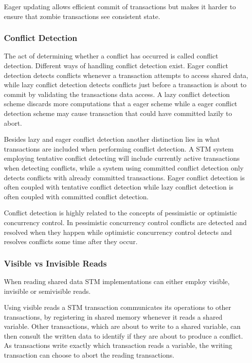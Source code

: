Eager updating allows efficient commit of transactions but makes it harder to ensure that zombie transactions see consistent state\cite[p. 2084]{herlihy2011tm}.

\subsubsection{Conflict Detection}
\label{sec:stm_conflict_detection}
The act of determining whether a conflict has occurred is called conflict detection\cite[p. 20]{harris2010transactional}. Different ways of handling conflict detection exist. Eager conflict detection detects conflicts whenever a transaction attempts to access shared data, while lazy conflict detection detects conflicts just before a transaction is about to commit by validating the transactions data access\cite[p. 21]{harris2010transactional}. A lazy conflict detection scheme discards more computations that a eager scheme while a eager conflict detection scheme may cause transaction that could have committed lazily to abort\cite[p. 21]{harris2010transactional}.

Besides lazy and eager conflict detection another distinction lies in what transactions are included when performing conflict detection. A \ac{STM} system employing tentative conflict detecting will include currently active transactions when detecting conflicts, while a system using committed conflict detection only detects conflicts with already committed transactions. Eager conflict detection is often coupled with tentative conflict detection while lazy conflict detection is often coupled with committed conflict detection\cite[p. 22]{harris2010transactional}.

Conflict detection is highly related to the concepts of pessimistic or optimistic concurrency control. In pessimistic concurrency control conflicts are detected and resolved when they happen\cite[p. 20]{harris2010transactional} while optimistic concurrency control detects and resolves conflicts some time after they occur\cite[p. 20]{harris2010transactional}.

\subsubsection{Visible vs Invisible Reads}
When reading shared data \ac{STM} implementations can either employ visible, invisible or semivisible reads.

Using visible reads a \ac{STM} transaction communicates its operations to other transactions, by registering in shared memory whenever it reads a shared variable\cite[p. 2]{lev2009anatomy}\cite[p. 2085]{herlihy2011tm}. Other transactions, which are about to write to a shared variable, can then consult the written data to identify if they are about to produce a conflict. As transactions write exactly which transaction reads a variable, the writing transaction can choose to abort the reading transactions\cite[p. 2]{lev2009anatomy}.

